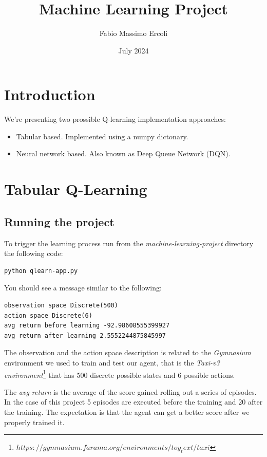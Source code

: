 \documentclass{article}
\title{\textbf{Machine Learning Project}}
\author{Fabio Massimo Ercoli}
\date{July 2024}
\begin{document}
\maketitle

\section{Introduction}

We're presenting two prossible Q-learning implementation approaches:
\begin{itemize}
  \item Tabular based. Implemented using a numpy dictonary.
  \item Neural network based. Also known as Deep Queue Network (DQN).
\end{itemize}

\section{Tabular Q-Learning}

\subsection{Running the project}

To trigger the learning process run from the \emph{machine-learning-project} directory the following code:

\begin{verbatim}
python qlearn-app.py
\end{verbatim}

You should see a message similar to the following:

\begin{verbatim}
observation space Discrete(500)
action space Discrete(6)
avg return before learning -92.98608555399927
avg return after learning 2.5552244875845997
\end{verbatim}

The observation and the action space description is related to the \emph{Gymnasium} environment we used to train and test our agent, 
that is the \emph{Taxi-v3 environment}\footnote[1]{$https://gymnasium.farama.org/environments/toy_text/taxi$} that has 500 discrete possible states and 6 possible actions.

The \emph{avg return} is the average of the score gained rolling out a series of episodes.
In the case of this project 5 episodes are executed before the training and 20 after the training.
The expectation is that the agent can get a better score after we properly trained it.
\end{document}
